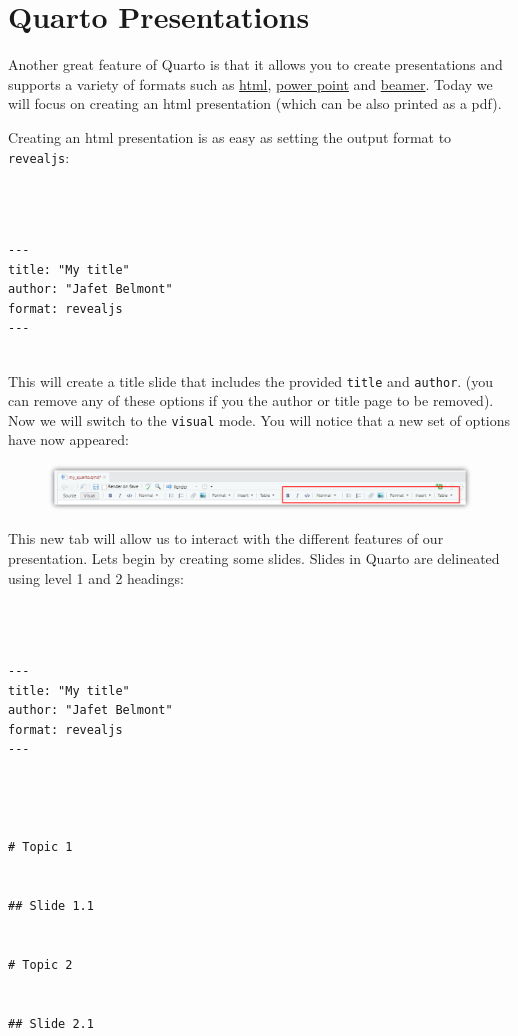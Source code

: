 \documentclass[
  letterpaper,
  DIV=11,
  numbers=noendperiod]{scrartcl}
\begin{document}
\hypertarget{quarto-presentations}{%
\section{Quarto Presentations}\label{quarto-presentations}}

Another great feature of Quarto is that it allows you to create
presentations and supports a variety of formats such as
\href{https://quarto.org/docs/presentations/revealjs/}{html},
\href{https://quarto.org/docs/presentations/powerpoint.html}{power
point} and
\href{https://quarto.org/docs/presentations/beamer.html}{beamer}. Today
we will focus on creating an html presentation (which can be also
printed as a pdf).

Creating an html presentation is as easy as setting the output format to
\texttt{revealjs}:

\begin{verbatim}



---
title: "My title"
author: "Jafet Belmont"
format: revealjs
---


\end{verbatim}

This will create a title slide that includes the provided \texttt{title}
and \texttt{author}. (you can remove any of these options if you the
author or title page to be removed). Now we will switch to the
\texttt{visual} mode. You will notice that a new set of options have now
appeared:

\begin{figure}

{\centering \includegraphics{images/quarto13.png}

}

\end{figure}

This new tab will allow us to interact with the different features of
our presentation. Lets begin by creating some slides. Slides in Quarto
are delineated using level 1 and 2 headings:

\begin{verbatim}



---
title: "My title"
author: "Jafet Belmont"
format: revealjs
---




# Topic 1


## Slide 1.1


# Topic 2


## Slide 2.1
\end{verbatim}
\end{document}
